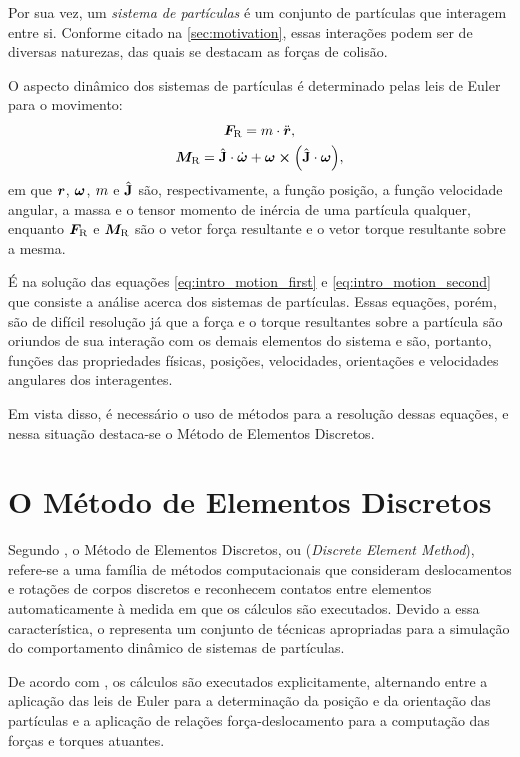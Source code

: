 Por sua vez, um \textit{sistema de partículas} é um conjunto de partículas que interagem entre si. Conforme citado na \autoref{sec:motivation}, essas interações podem ser de diversas naturezas, das quais se destacam as forças de colisão.

O aspecto dinâmico dos sistemas de partículas é determinado pelas leis de Euler para o movimento:
\begin{gather}
	{\resultingForce} = \mass\cdot\acceleration, \label{eq:intro_motion_first}\\
	{\resultingTorque} = \tensorOfInertia\cdot\deriv{1}{\angularVelocity} + \angularVelocity\cross\pqty{\tensorOfInertia\cdot\angularVelocity}, \label{eq:intro_motion_second}
\end{gather}
em que \(\bm{r}\), \(\bm{\omega}\), \(m\) e \(\hat{\mathbf{J}}\) são, respectivamente, a função posição, a função velocidade angular, a massa e o tensor momento de inércia de uma partícula qualquer, enquanto \({\bm{F}_{\text{R}}}\) e \({\bm{M}_{\text{R}}}\) são o vetor força resultante e o vetor torque resultante sobre a mesma.

É na solução das equações \eqref{eq:intro_motion_first} e \eqref{eq:intro_motion_second} que consiste a análise acerca dos sistemas de partículas. Essas equações, porém, são de difícil resolução já que a força e o torque resultantes sobre a partícula são oriundos de sua interação com os demais elementos do sistema e são, portanto, funções das propriedades físicas, posições, velocidades, orientações e velocidades angulares dos interagentes.

Em vista disso, é necessário o uso de métodos para a resolução dessas equações, e nessa situação destaca-se o Método de Elementos Discretos.

\section{O Método de Elementos Discretos} 

Segundo , o Método de Elementos Discretos, ou \DEM{} (\textit{Discrete Element Method}), refere-se a uma família de métodos computacionais que consideram deslocamentos e rotações de corpos discretos e reconhecem contatos entre elementos automaticamente à medida em que os cálculos são executados. Devido a essa característica, o \DEM{} representa um conjunto de técnicas apropriadas para a simulação do comportamento dinâmico de sistemas de partículas.

De acordo com , os cálculos são executados explicitamente, alternando entre a aplicação das leis de Euler para a determinação da posição e da orientação das partículas e a aplicação de relações força-deslocamento para a computação das forças e torques atuantes.

